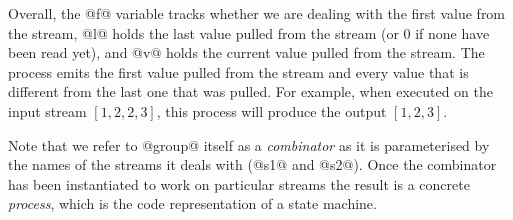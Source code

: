 Overall, the @f@ variable tracks whether we are dealing with the first value from the stream, @l@ holds the last value pulled from the stream (or 0 if none have been read yet), and @v@ holds the current value pulled from the stream. The process emits the first value pulled from the stream and every value that is different from the last one that was pulled. For example, when executed on the input stream $[1, 2, 2, 3]$, this process will produce the output $[1, 2, 3]$.

Note that we refer to @group@ itself as a \emph{combinator} as it is parameterised by the names of the streams it deals with (@s1@ and @s2@). Once the combinator has been instantiated to work on particular streams the result is a concrete \emph{process}, which is the code representation of a state machine.







